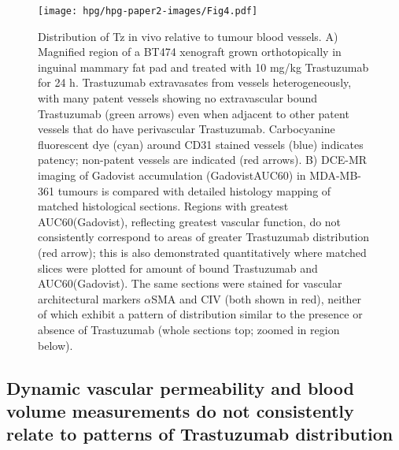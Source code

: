\begin{figure}[htbp] %
  \centering
  \texttt{[image: hpg/hpg-paper2-images/Fig4.pdf]} 
  \captionsetup{width=1.2\linewidth}
  \caption{Distribution of Tz in vivo relative to tumour blood vessels. 
  A) Magnified region of a \acs{BT474} xenograft grown orthotopically in inguinal mammary fat pad and treated with 10 mg/kg Trastuzumab for 24 h. 
  Trastuzumab extravasates from vessels heterogeneously, with many patent vessels showing no extravascular bound Trastuzumab (green arrows) even when adjacent to other patent vessels that do have perivascular Trastuzumab. 
  Carbocyanine fluorescent dye (cyan) around CD31 stained vessels (blue) indicates patency; non-patent vessels are indicated (red arrows). 
  B) DCE-MR imaging of Gadovist accumulation (GadovistAUC60) in \acs{MDA-MB-361} tumours is compared with detailed histology mapping of matched histological sections. 
  Regions with greatest AUC60(Gadovist), reflecting greatest vascular function, do not consistently correspond to areas of greater Trastuzumab distribution (red arrow); this is also demonstrated quantitatively where matched slices were plotted for amount of bound Trastuzumab and AUC60(Gadovist). 
  The same sections were stained for vascular architectural markers $\alpha$SMA and CIV (both shown in red), neither of which exhibit a pattern of distribution similar to the presence or absence of Trastuzumab (whole sections top; zoomed in region below).}
  \label{hpgpaper2:fig4}
\end{figure}

\subsection{Dynamic vascular permeability and blood volume measurements do not consistently relate to patterns of Trastuzumab distribution}

